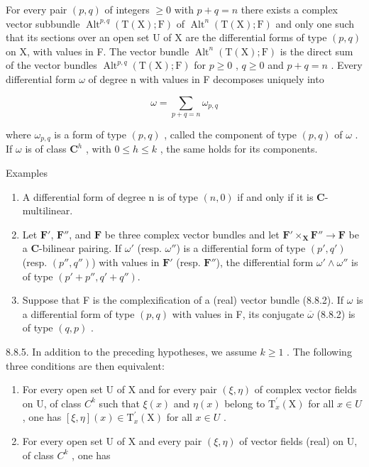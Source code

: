 For every pair \((p,q)\) of integers \(\geqslant0\) with \(p+q=n\) there exists a complex vector subbundle \(\operatorname{Alt}^{p,q}(\mathrm{T}(\mathrm{X});\mathrm{F})\) of \(\operatorname{Alt}^{n}(\mathrm{T}(\mathrm{X});\mathrm{F})\) and only one such that its sections over an open set U of X are the differential forms of type \((p,q)\) on X, with values in F. The vector bundle \(\operatorname{Alt}^{n}(\mathrm{T}(\mathrm{X});\mathrm{F})\) is the direct sum of the vector bundles \(\operatorname{Alt}^{p,q}(\mathrm{T}(\mathrm{X});\mathrm{F})\) for \(p\geqslant0\) , \(q\geqslant0\) and \(p+q=n\) . Every differential form \(\omega\) of degree n with values in F decomposes uniquely into

\[
\omega = \sum_ {p + q = n} \omega_ {p, q}
\]

where \(\omega_{p,q}\) is a form of type \((p,q)\) , called the component of type \((p,q)\) of \(\omega\) . If \(\omega\) is of class \(\mathbf{C}^h\) , with \(0 \leqslant h \leqslant k\) , the same holds for its components.

Examples

\begin{enumerate}
\def\labelenumi{\alph{enumi})}
\item
  A differential form of degree n is of type \((n, 0)\) if and only if it is \(\mathbf{C}\)-multilinear.
\item
  Let \(\mathbf{F}'\), \(\mathbf{F}''\), and \(\mathbf{F}\) be three complex vector bundles and let \(\mathbf{F}' \times_{\mathbf{X}} \mathbf{F}'' \to \mathbf{F}\) be a \(\mathbf{C}\)-bilinear pairing. If \(\omega'\) (resp. \(\omega''\)) is a differential form of type \((p',q')\) (resp. \((p'',q'')\)) with values in \(\mathbf{F}'\) (resp. \(\mathbf{F}''\)), the differential form \(\omega' \wedge \omega''\) is of type \((p' + p'',q' + q'')\).
\item
  Suppose that F is the complexification of a (real) vector bundle (8.8.2). If \(\omega\) is a differential form of type \((p, q)\) with values in F, its conjugate \(\overline{\omega}\) (8.8.2) is of type \((q, p)\) .
\end{enumerate}

8.8.5. In addition to the preceding hypotheses, we assume \(k \geqslant 1\) . The following three conditions are then equivalent:

\begin{enumerate}
\def\labelenumi{(\roman{enumi})}
\item
  For every open set U of X and for every pair \((\xi, \eta)\) of complex vector fields on U, of class \(C^{k}\) such that \(\xi(x)\) and \(\eta(x)\) belong to \(\mathrm{T}_{x}^{\prime}(\mathrm{X})\) for all \(x \in U\) , one has \([\xi, \eta](x) \in \mathrm{T}_{x}^{\prime}(\mathrm{X})\) for all \(x \in U\) .
\item
  For every open set U of X and every pair \((\xi, \eta)\) of vector fields (real) on U, of class \(C^{k}\) , one has
\end{enumerate}


